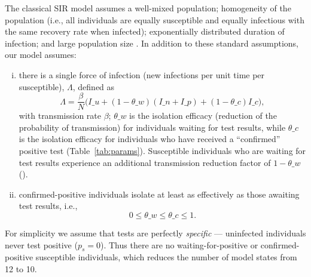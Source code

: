 The classical SIR model assumes a well-mixed population; homogeneity of the population (i.e., all individuals are equally susceptible and equally infectious with the same recovery rate when infected); exponentially distributed duration of infection; and large population size \citep{keeling2011modeling}. In addition to these standard assumptions, our model assumes: 
\begin{enumerate}[(i)]
\item there is a single force of infection (new infections per unit time per susceptible), $\Lambda$, defined as
  \begin{equation}
  \label{Lambda}
  \Lambda=\frac{\beta}{N} \big(I\_u + (1-\theta\_w)(I\_n+I\_p) + (1-\theta\_c)I\_c \big),
  \end{equation}
with transmission rate $\beta$; $\theta\_w$ is the isolation efficacy (reduction of the probability of transmission) for individuals waiting for test results, while $\theta\_c$ is the isolation efficacy for individuals who have received a ``confirmed'' positive test (Table~\ref{tab:params}). Susceptible individuals who are waiting for test results experience an additional transmission reduction factor of $1-\theta\_w$ (). 
\item confirmed-positive individuals isolate at least as effectively as those awaiting test results, i.e.,
$$0\leq\theta\_w\leq\theta\_c\leq 1.$$ 
\end{enumerate}
For simplicity we assume that tests are perfectly \emph{specific} --- uninfected individuals never test positive ($p_s=0$). Thus there are no waiting-for-positive or confirmed-positive susceptible individuals, which reduces the number of model states from 12 to 10.

